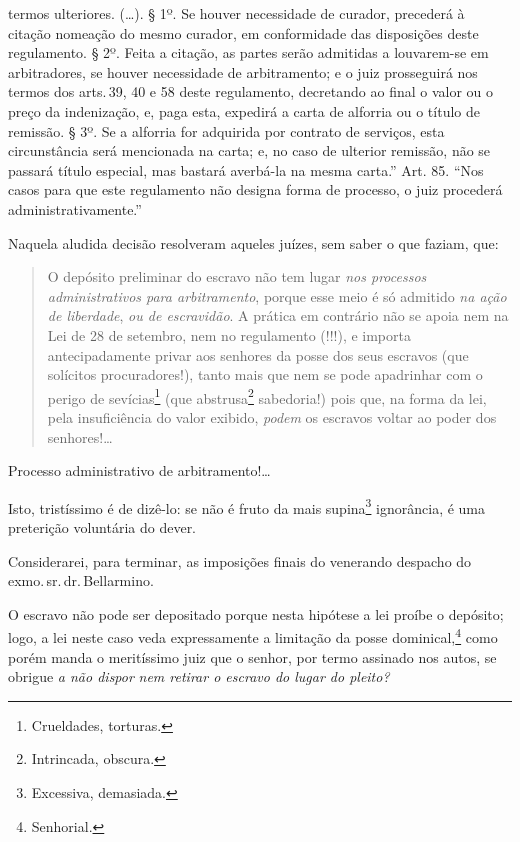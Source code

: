 {{  termos ulteriores. (\ldots{}). § 1º. Se houver necessidade de curador,
  precederá à citação nomeação do mesmo curador, em conformidade das
  disposições deste regulamento. § 2º. Feita a citação, as partes serão
  admitidas a louvarem-se em arbitradores, se houver necessidade de
  arbitramento; e o juiz prosseguirá nos termos dos arts.\,39, 40 e 58
  deste regulamento, decretando ao final o valor ou o preço da
  indenização, e, paga esta, expedirá a carta de alforria ou o título de
  remissão. § 3º. Se a alforria for adquirida por contrato de serviços,
  esta circunstância será mencionada na carta; e, no caso de ulterior
  remissão, não se passará título especial, mas bastará averbá-la na
  mesma carta.'' Art. 85. ``Nos casos para que este regulamento não designa
  forma de processo, o juiz procederá administrativamente.''}

Naquela aludida decisão resolveram aqueles juízes, sem saber o que
faziam, que:

\begin{quote}
O depósito preliminar do escravo não tem lugar \emph{nos processos
administrativos para arbitramento}, porque esse meio é só admitido
\emph{na ação de liberdade}, \emph{ou de escravidão}. A prática em
contrário não se apoia nem na Lei de 28 de setembro, nem no regulamento
(!!!), e importa antecipadamente privar aos senhores da posse dos seus
escravos (que solícitos procuradores!), tanto mais que nem se pode
apadrinhar com o perigo de sevícias\footnote{Crueldades, torturas.}
(que abstrusa\footnote{Intrincada, obscura.} sabedoria!) pois que, na
forma da lei, pela insuficiência do valor exibido, \emph{podem} os
escravos voltar ao poder dos senhores!\ldots{}
\end{quote}

Processo administrativo de arbitramento!\ldots{}

Isto, tristíssimo é de dizê-lo: se não é fruto da mais supina\footnote{
  Excessiva, demasiada.} ignorância, é uma preterição voluntária do
dever.

Considerarei, para terminar, as imposições finais do venerando despacho
do exmo.\,sr.\,dr.\,Bellarmino.

O escravo não pode ser depositado porque nesta hipótese a lei proíbe o
depósito; logo, a lei neste caso veda expressamente a limitação da posse
dominical,\footnote{Senhorial.} como porém manda o meritíssimo juiz
que o senhor, por termo assinado nos autos, se obrigue \emph{a não
dispor} \emph{nem retirar o escravo do lugar do pleito? }

}
